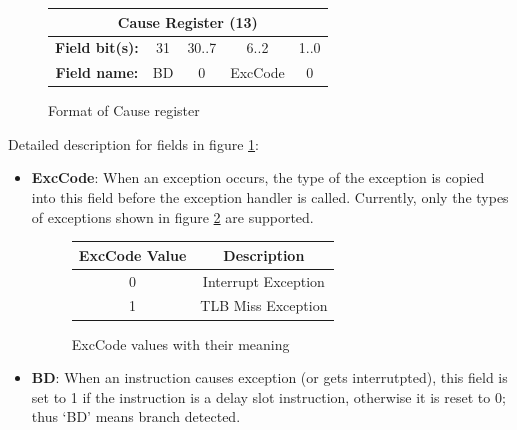 \documentclass[]{scrartcl}
\begin{document}
\begin{itemize}
\begin{figure}[H]
\begin{center}
\begin{tabular}{|c|c|c|c|c|}

\hline \multicolumn{5}{|c|}{Cause Register (13)} \\

\hline \textbf{Field bit(s):} & 31 & 30..7 & 6..2    & 1..0 \\

\hline \textbf{Field name:}   & BD & 0     & ExcCode & 0    \\

\hline

\end{tabular}

\end{center}
\caption{Format of Cause register}
\label{cause_reg}
\end{figure}

Detailed description for fields in figure \ref{cause_reg}:

\begin{itemize}

\item \textbf{ExcCode}: When an exception occurs, the type
      of the exception is copied into this field before
      the exception handler is called. Currently, only
      the types of exceptions shown in figure \ref{exccode}
      are supported.

      \begin{figure}[H]
      \begin{center}
      \begin{tabular}{|c|c|}
      \hline \textbf{ExcCode Value} & \textbf{Description} \\
      \hline 0                      & Interrupt Exception \\
      \hline 1                      & TLB Miss Exception \\
      \hline
      \end{tabular}
      \end{center}
      \caption{ExcCode values with their meaning}
      \label{exccode}
      \end{figure}

\item \textbf{BD}: When an instruction causes exception (or
      gets interrutpted), this field is set to 1 if the
      instruction is a delay slot instruction, otherwise
      it is reset to 0; thus `BD' means branch detected.


\end{itemize}
\end{itemize}
\end{document}
